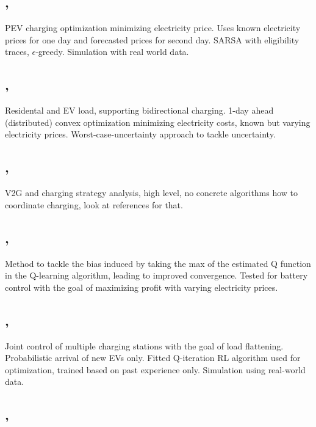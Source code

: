 \documentclass[a4paper]{article}
\begin{document}
\begin{multicols}{2}
	\subsection{, \cite{6695263}}
	
	PEV charging optimization minimizing electricity price. 
	Uses known electricity prices for one day and forecasted
	prices for second day. SARSA with eligibility traces, $\epsilon$-greedy.
	Simulation with real world data. 
	
	\subsection{, \cite{6547831}}
	
	Residental and EV load, supporting bidirectional charging.
	1-day ahead (distributed) convex optimization minimizing 
	electricity costs, known but varying electricity prices.
	Worst-case-uncertainty approach to tackle uncertainty.
	
	\subsection{, \cite{HABIB2015205}}
	
	V2G and charging strategy analysis, high level, no concrete
	algorithms how to coordinate charging, look at references for that.
	
	\subsection{, \cite{LDPWB2012}}
	
	Method to tackle the bias induced by taking the max of the 
	estimated Q function in the
	Q-learning algorithm, leading to improved convergence. 
	Tested for battery control with the goal of maximizing 
	profit with varying electricity prices.
	
	\subsection{, \cite{8727484}}
	
	Joint control of multiple charging stations with the goal
	of load flattening. Probabilistic arrival of new EVs only. 
	Fitted Q-iteration RL algorithm used for optimization, trained based on
	past experience only.
	Simulation using real-world data.
	
	\subsection{, \cite{4802962}}
	

\end{multicols}
\end{document}
